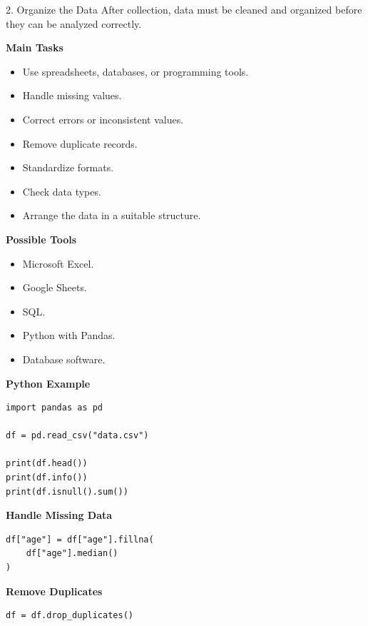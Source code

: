 \documentclass[aspectratio=169,11pt]{beamer}
\begin{document}
\begin{frame}{2. Organize the Data}
\footnotesize
After collection, data must be cleaned and organized before they can be analyzed correctly.\par\medskip
\textbf{Main Tasks}\par\medskip
\begin{itemize}
\item Use spreadsheets, databases, or programming tools.
\item Handle missing values.
\item Correct errors or inconsistent values.
\item Remove duplicate records.
\item Standardize formats.
\item Check data types.
\item Arrange the data in a suitable structure.
\end{itemize}
\textbf{Possible Tools}\par\medskip
\begin{itemize}
\item Microsoft Excel.
\item Google Sheets.
\item SQL.
\item Python with Pandas.
\item Database software.
\end{itemize}
\textbf{Python Example}\par\medskip
\begin{lstlisting}[style=py]
import pandas as pd

df = pd.read_csv("data.csv")

print(df.head())
print(df.info())
print(df.isnull().sum())
\end{lstlisting}
\textbf{Handle Missing Data}\par\medskip
\begin{lstlisting}[style=py]
df["age"] = df["age"].fillna(
    df["age"].median()
)
\end{lstlisting}
\textbf{Remove Duplicates}\par\medskip
\begin{lstlisting}[style=py]
df = df.drop_duplicates()
\end{lstlisting}
\end{frame}
\end{document}
